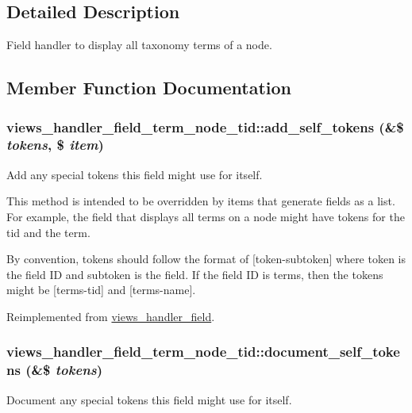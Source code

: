 \subsection{Detailed Description}
Field handler to display all taxonomy terms of a node. 

\subsection{Member Function Documentation}
\hypertarget{classviews__handler__field__term__node__tid_a7fea3443ab075e3e35212ddc3b0d95f3}{
\subsubsection[{add\_\-self\_\-tokens}]{\setlength{\rightskip}{0pt plus 5cm}views\_\-handler\_\-field\_\-term\_\-node\_\-tid::add\_\-self\_\-tokens (\&\$ {\em tokens}, \/  \$ {\em item})}}
\label{classviews__handler__field__term__node__tid_a7fea3443ab075e3e35212ddc3b0d95f3}
Add any special tokens this field might use for itself.

This method is intended to be overridden by items that generate fields as a list. For example, the field that displays all terms on a node might have tokens for the tid and the term.

By convention, tokens should follow the format of \mbox{[}token-\/subtoken\mbox{]} where token is the field ID and subtoken is the field. If the field ID is terms, then the tokens might be \mbox{[}terms-\/tid\mbox{]} and \mbox{[}terms-\/name\mbox{]}. 

Reimplemented from \hyperlink{classviews__handler__field_ac61cc83a4c8c579993a254b5b1e16cbc}{views\_\-handler\_\-field}.\hypertarget{classviews__handler__field__term__node__tid_afa909e51eb90573d468deb29a3943d94}{
\subsubsection[{document\_\-self\_\-tokens}]{\setlength{\rightskip}{0pt plus 5cm}views\_\-handler\_\-field\_\-term\_\-node\_\-tid::document\_\-self\_\-tokens (\&\$ {\em tokens})}}
\label{classviews__handler__field__term__node__tid_afa909e51eb90573d468deb29a3943d94}
Document any special tokens this field might use for itself.

